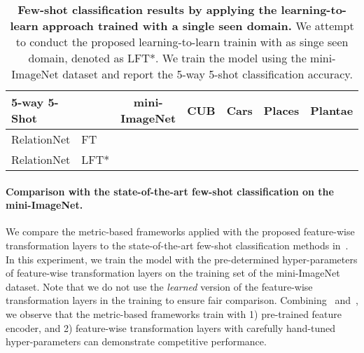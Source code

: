 \begin{table}[t]\scriptsize
	\centering
	\caption{\textbf{Few-shot classification results by applying the learning-to-learn approach trained with a single seen domain.} We attempt to conduct the proposed learning-to-learn trainin with as singe seen domain, denoted as LFT*. We train the model using the mini-ImageNet dataset and report the 5-way 5-shot classification accuracy.}
	\begin{tabular}{ll|c|cccc} 
	    \toprule
	    5-way 5-Shot &  & mini-ImageNet & CUB & Cars & Places & Plantae\\
		\midrule
		RelationNet & FT &  &  &  &  & \\
		RelationNet & LFT* &  &  &  &  & \\
		\bottomrule 
	\end{tabular}
	\label{tab:l2lsingle}
\end{table}



\paragraph{Comparison with the state-of-the-art few-shot classification on the mini-ImageNet.}
We compare the metric-based frameworks applied with the proposed feature-wise transformation layers to the state-of-the-art few-shot classification methods in~.
In this experiment, we train the model with the pre-determined hyper-parameters of feature-wise transformation layers on the training set of the mini-ImageNet~\citep{ravi2017metalstm} dataset.
Note that we do not use the \emph{learned} version of the feature-wise transformation layers in the training to ensure fair comparison.
Combining~ and~, we observe that the metric-based frameworks train with 1) pre-trained feature encoder, and 2) feature-wise transformation layers with carefully hand-tuned hyper-parameters can demonstrate competitive performance.


